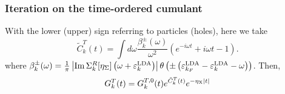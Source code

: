 \subsubsection{Iteration on the time-ordered cumulant}
With the lower (upper) sign referring to particles (holes), here we take
\begin{equation}
    \tilde{C}_k^T(t)=\int d \omega \frac{\beta_k^{ \pm}(\omega)}{\omega^2}\left(e^{-i \omega t}+i \omega t-1\right) .
\end{equation}
where $\beta_k^{ \pm}(\omega)= \frac{1}{\pi}\left|\operatorname{Im} \Sigma_k^R[\eta_{\Sigma}]\left(\omega+\varepsilon_k^{\mathrm{LDA}}\right)\right| \theta\left( \pm\left(\varepsilon_{k_F}^{\mathrm{LDA}}-\varepsilon_k^{\mathrm{LDA}}-\omega\right)\right)$. 
Then,
\begin{equation}
G_k^T(t)=G_k^{T, 0}(t) e^{\tilde{C}_k^T(t)} e^{-\eta_{\rm X} |t|}
\end{equation}
